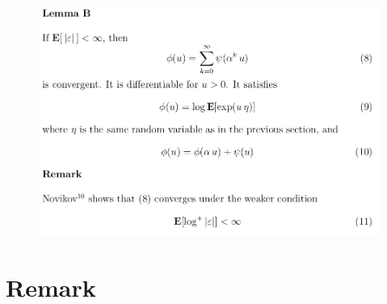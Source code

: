 \documentclass[c, dvipsnames, 8pt]{beamer}
\begin{document}
\begin{frame}[shrink=5]
	
	
	
	\frametitle{\insertsection} 
	\begin{figure}
		\centering
		\includegraphics[width=1\linewidth]{screenshot048}
		\label{fig:screenshot001}
	\end{figure}
	


	
	
\end{frame}

%
%	
%	
%	
%	
%	
%	
%	
%	
%

\section{Remark}
\end{document}
